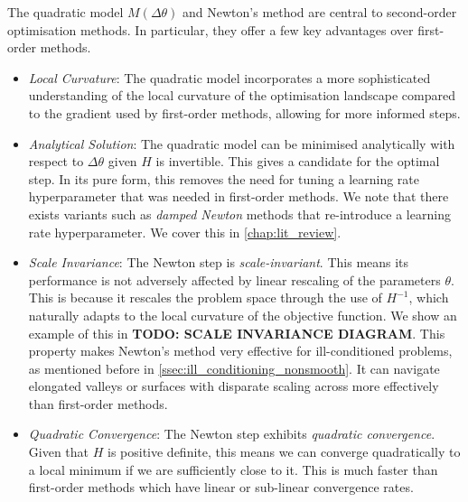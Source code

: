 The quadratic model $M(\Delta \theta)$ and Newton's method are central to second-order optimisation methods. In particular, they offer a few key advantages over first-order methods. 
\begin{itemize}
    \item \textit{Local Curvature}: The quadratic model incorporates a more sophisticated understanding of the local curvature of the optimisation landscape compared to the gradient used by first-order methods, allowing for more informed steps.
    \item \textit{Analytical Solution}: The quadratic model can be minimised analytically with respect to $\Delta \theta$ given $H$ is invertible. This gives a candidate for the optimal step. In its pure form, this removes the need for tuning a learning rate hyperparameter that was needed in first-order methods. We note that there exists variants such as \textit{damped Newton} methods that re-introduce a learning rate hyperparameter. We cover this in \cref{chap:lit_review}.
    \item \textit{Scale Invariance}: The Newton step is \textit{scale-invariant}. This means its performance is not adversely affected by linear rescaling of the parameters $\theta$. This is because it rescales the problem space through the use of $H^{-1}$, which naturally adapts to the local curvature of the objective function. We show an example of this in \textbf{TODO: SCALE INVARIANCE DIAGRAM}.
    This property makes Newton's method very effective for ill-conditioned problems, as mentioned before in \cref{ssec:ill_conditioning_nonsmooth}. It can navigate elongated valleys or surfaces with disparate scaling across more effectively than first-order methods.
    \item \textit{Quadratic Convergence}: The Newton step exhibits \textit{quadratic convergence}. Given that $H$ is positive definite, this means we can converge quadratically to a local minimum if we are sufficiently close to it. This is much faster than first-order methods which have linear or sub-linear convergence rates.
\end{itemize}

